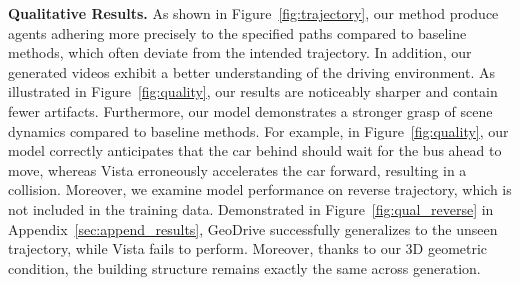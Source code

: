 \documentclass{article}
\begin{document}
\textbf{Qualitative Results.}
As shown in Figure~\ref{fig:trajectory}, our method produce agents adhering more precisely to the specified paths compared to baseline methods, which often deviate from the intended trajectory.
In addition, our generated videos exhibit a better understanding of the driving environment. As illustrated in Figure~\ref{fig:quality}, our results are noticeably sharper and contain fewer artifacts. Furthermore, our model demonstrates a stronger grasp of scene dynamics compared to baseline methods. For example, in Figure~\ref{fig:quality}, our model correctly anticipates that the car behind should wait for the bus ahead to move, whereas Vista erroneously accelerates the car forward, resulting in a collision.
Moreover, we examine model performance on reverse trajectory, which is not included in the training data. Demonstrated in Figure~\ref{fig:qual_reverse} in Appendix~\ref{sec:append_results}, GeoDrive successfully generalizes to the unseen trajectory, while Vista fails to perform. Moreover, thanks to our 3D geometric condition, the building structure remains exactly the same across generation. 
\end{document}
